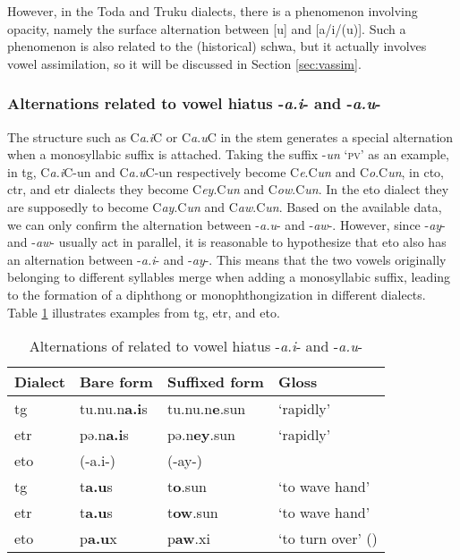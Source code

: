 However, in the Toda and Truku dialects, there is a phenomenon involving opacity, namely the surface alternation between [u] and [a/i/(u)]. Such a phenomenon is also related to the (historical) schwa, but it actually involves vowel assimilation, so it will be discussed in Section \ref{sec:vassim}.

\subsubsection{Alternations related to vowel hiatus -\textit{a.i}- and -\textit{a.u}-} \label{sec:sed_ai_au}

The structure such as C\textit{a}.\textit{i}C or C\textit{a}.\textit{u}C in the stem generates a special alternation when a monosyllabic suffix is attached. Taking the suffix -\textit{un} `\textsc{pv}' as an example, in \acl{tg}, C\textit{a.i}C-un and C\textit{a.u}C-un respectively become C\textit{e}.C\textit{un} and C\textit{o}.C\textit{un}, in \acl{cto}, \acl{ctr}, and \acl{etr} dialects they become C\textit{ey}.C\textit{un} and C\textit{ow}.C\textit{un}. In the \acl{eto} dialect they 
are supposedly to become C\textit{ay}.C\textit{un} and C\textit{aw}.C\textit{un}. Based on the available data, we can only confirm the alternation between -\textit{a.u}- and -\textit{aw}-. However, since -\textit{ay}- and -\textit{aw}- usually act in parallel, it is reasonable to hypothesize that \acl{eto} also has an alternation between -\textit{a.i}- and -\textit{ay}-. This means that the two vowels originally belonging to different syllables merge when adding a monosyllabic suffix, leading to the formation of a diphthong or monophthongization in different dialects. Table \ref{tab:aiau_alt} illustrates examples from \acl{tg}, \acl{etr}, and \acl{eto}.

\begin{table}[!htbp]
\centering
\caption{Alternations of related to vowel hiatus -\textit{a.i}- and -\textit{a.u}-}
\label{tab:aiau_alt}
\begin{tabular}{llll}
\hline
Dialect   & Bare form   & Suffixed form & Gloss                           \\ \hline
\acl{tg}  & tu.nu.n\textbf{a.i}s & tu.nu.n\textbf{e}.sun  & `rapidly'      \\
\acl{etr} & pə.n\textbf{a.i}s    & pə.n\textbf{ey}.sun    & `rapidly'                       \\
\acl{eto} & (-a.i-)   & (-ay-)    &                                \\ 
\hdashline
\acl{tg}  & t\textbf{a.u}s       & t\textbf{o}.sun        & `to wave hand' \\
\acl{etr} & t\textbf{a.u}s       & t\textbf{ow}.sun       & `to wave hand' \\
\acl{eto} & p\textbf{a.u}x       & p\textbf{aw}.xi        & `to turn over' (\cite[98]{lee2015tawsa})\\ \hline
\end{tabular}
\end{table}


